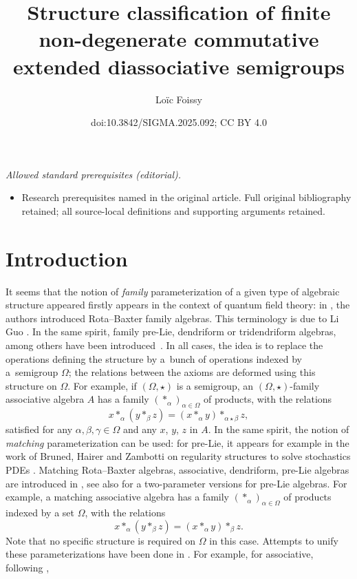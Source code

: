 \documentclass[10pt,a4paper]{amsart}
\title{Structure classification of finite non-degenerate commutative extended diassociative semigroups}
\author{Loïc Foissy}
\date{doi:10.3842/SIGMA.2025.092; CC BY 4.0}
\numberwithin{equation}{section}
\begin{document}
\maketitle
\noindent\textit{Allowed standard prerequisites (editorial).}\begin{itemize}
\item Research prerequisites named in the original article. Full original bibliography retained; all source-local definitions and supporting arguments retained.
\end{itemize}\medskip
\section{Introduction}

It seems that the notion of \emph{family} parameterization of a given type of algebraic structure appeared firstly appears in the context of quantum field theory:
in \cite{Ebrahimi-Fard2007}, the authors introduced Rota--Baxter family algebras. This terminology is due to Li Guo \cite{Guo2009}. In the same spirit, family pre-Lie, dendriform or tridendriform algebras, among others have been introduced~\cite{Foissy49,Zhang2019,Zhang2020,Zhang2020-3,Manchon2020}. In all cases, the idea is to replace the operations defining the structure by a~bunch of operations indexed by a~semigroup $\Omega$;
the relations between the axioms are deformed using this structure on $\Omega$.
For example, if $(\Omega,\star)$ is a semigroup, an $(\Omega,\star)$-family associative algebra $A$ has a family $(*_\alpha)_{\alpha \in \Omega}$ of products, with the relations
\[x*_\alpha (y *_\beta z)=( x*_\alpha y)*_{\alpha \star \beta}z,\]
satisfied for any $\alpha,\beta,\gamma \in \Omega$ and any $x$, $y$, $z$ in $A$. In the same spirit, the notion of \emph{matching} parameterization can be used: for pre-Lie, it appears for example in the work of Bruned, Hairer and Zambotti
on regularity structures to solve stochastics PDEs \cite{Bruned2019,Bruned2023,Bruned2023-1,Foissy47}.
Matching Rota--Baxter algebras, associative, dendriform, pre-Lie algebras are introduced in \cite{Foissy47,Zhang2020}, see also \cite{Foissy49} for a two-parameter versions for pre-Lie algebras.
For example, a matching associative algebra has a family $(*_\alpha)_{\alpha \in \Omega}$ of products indexed by a set $\Omega$, with the relations
\[x*_\alpha (y *_\beta z)=(x *_\alpha y)*_\beta z.\]
Note that no specific structure is required on $\Omega$ in this case.
Attempts to unify these parameterizations have been done in \cite{Foissy56,Foissy48,Foissy50}. For example, for associative, following \cite{Foissy56},
\end{document}
